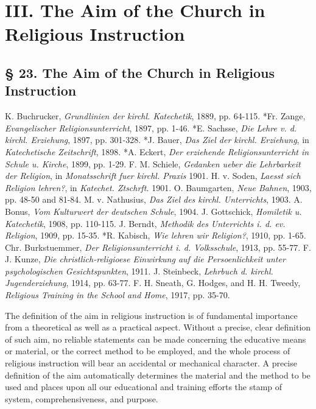 \part[III. The Aim of the Church]{III. The Aim of the Church in Religious Instruction}

\chapter[§ 23. The Aim of the Church]{§ 23. The Aim of the Church in Religious Instruction}

K. Buchrucker, \emph{Grundlinien der kirchl. Katechetik}, 1889, pp. 64-115. *Fr. Zange, \emph{Evangelischer Religionsunterricht}, 1897, pp. 1-46. *E. Sachsse, \emph{Die Lehre v. d. kirchl. Erziehung}, 1897, pp. 301-328. *J. Bauer, \emph{Das Ziel der kirchl. Erziehung}, in \emph{Katechetische Zeitschrift}, 1898. *A. Eckert, \emph{Der erziehende Religionsunterricht in Schule u. Kirche}, 1899, pp. 1-29. F. M. Schiele, \emph{Gedanken ueber die Lehrbarkeit der Religion}, in \emph{Monatsschrift fuer kirchl. Praxis} 1901. H. v. Soden, \emph{Laesst sich Religion lehren?}, in \emph{Katechet. Ztschrft.} 1901. O. Baumgarten, \emph{Neue Bahnen}, 1903, pp. 48-50 and 81-84. M. v. Nathusius, \emph{Das Ziel des kirchl. Unterrichts}, 1903. A. Bonus, \emph{Vom Kulturwert der deutschen Schule}, 1904. J. Gottschick, \emph{Homiletik u. Katechetik}, 1908, pp. 110-115. J. Berndt, \emph{Methodik des Unterrichts i. d. ev. Religion}, 1909, pp. 15-35. *R. Kabisch, \emph{Wie lehren wir Religion?}, 1910, pp. 1-65. Chr. Burkstuemmer, \emph{Der Religionsunterricht i. d. Volksschule}, 1913, pp. 55-77. F. J. Kunze, \emph{Die christlich-religioese Einwirkung auf die Persoenlichkeit unter psychologischen Gesichtspunkten}, 1911. J. Steinbeck, \emph{Lehrbuch d. kirchl. Jugenderziehung}, 1914, pp. 63-77. F. H. Sneath, G. Hodges, and H. H. Tweedy, \emph{Religious Training in the School and Home}, 1917, pp. 35-70.

The definition of the aim in religious instruction is of fundamental importance from a theoretical as well as a practical aspect. Without a precise, clear definition of such aim, no reliable statements can be made concerning the educative means or material, or the correct method to be employed, and the whole process of religious instruction will bear an accidental or mechanical character. A precise definition of the aim automatically determines the material and the method to be used and places upon all our educational and training efforts the stamp of system, comprehensiveness, and purpose.

